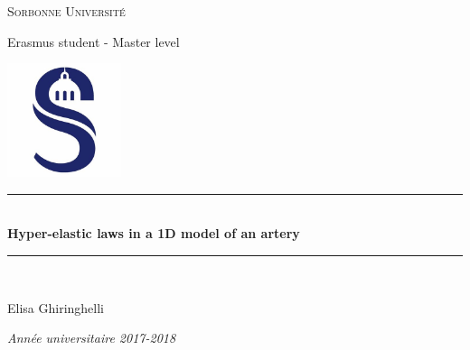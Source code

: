 \documentclass[12pt,a4paper]{article}
\numberwithin{equation}{section}
\begin{document}
\newenvironment{changemargin}[2]{\begin{list}{}{%
\setlength{\topsep}{0pt}%
\setlength{\leftmargin}{0pt}%
\setlength{\rightmargin}{0pt}%
\setlength{\listparindent}{\parindent}%
\setlength{\itemindent}{\parindent}%
\setlength{\parsep}{0pt plus 1pt}%
\addtolength{\leftmargin}{#1}%
\addtolength{\rightmargin}{#2}%
}\item }{\end{list}}

\headsep 0.0cm
\textheight=23cm
\textwidth=16.8cm
\hoffset=0.0cm
\oddsidemargin 0cm
\evensidemargin 0cm
\voffset=0.5cm
\topmargin 0cm
\headheight 0.5cm

\begin{titlepage}
\begin{center}
\newcommand{\HRule}{\rule{\linewidth}{0.5mm}}

\vspace*{1cm}
\textsc{\LARGE Sorbonne Université}

\begin{center} 
{Erasmus student - Master level}
\end{center}
\vspace*{1cm}
\begin{center}
\includegraphics[width=0.25\textwidth]{Logo.png}
\end{center}
\HRule \\[0.4cm]
{ \huge \bfseries Hyper-elastic laws in a 1D model of an artery\\[0.4cm] }
\HRule \\[1.5cm]
\begin{center} 
{Elisa Ghiringhelli}
\end{center}
\vspace*{1cm}
\vspace*{7cm}

\begin{minipage}{0.4\textwidth}
\begin{flushleft} \large
\emph{Année universitaire 2017-2018}
\end{flushleft}
\end{minipage}

\end{center}

\end{titlepage}
\newpage
\tableofcontents
\end{document}
